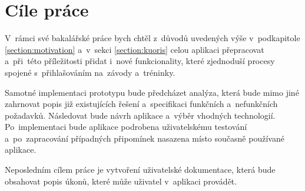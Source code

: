 \section{Cíle práce}
V~rámci své bakalářské práce bych chtěl z~důvodů uvedených výše v~podkapitole \ref{section:motivation} a~v~sekci \ref{section:kuoris} celou aplikaci přepracovat a~při~této příležitosti přidat i~nové funkcionality, které zjednoduší procesy spojené s~přihlašováním na~závody a~tréninky.
 
Samotné implementaci prototypu bude předcházet analýza, která bude mimo jiné zahrnovat popis již existujících řešení a~specifikaci funkčních a~nefunkčních požadavků. Následovat bude návrh aplikace a~výběr vhodných technologií. Po~implementaci bude aplikace podrobena uživatelskému testování a~po~zapracování případných připomínek nasazena místo současně používané aplikace.

Neposledním cílem práce je vytvoření uživatelské dokumentace, která bude obsahovat popis úkonů, které může uživatel v~aplikaci provádět.
